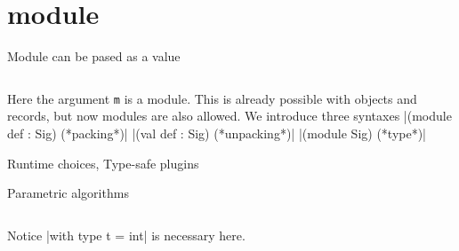 \section{module}

Module can be pased as a value


\inputminted[fontsize=\scriptsize, ]{ocaml}{lang/code/module/intro.ml}

 
Here the argument \verb|m| is a module. This is already possible with
objects and records, but now modules are also allowed.
We introduce three syntaxes 
|(module def : Sig) (*packing*)|
|(val def : Sig) (*unpacking*)|
|(module Sig) (*type*)|




Runtime choices, Type-safe plugins

Parametric algorithms
\inputminted[fontsize=\scriptsize, ]{ocaml}{lang/code/param.ml}

Notice |with type t = int| is necessary here.
\inputminted[fontsize=\scriptsize, ]{ocaml}{lang/code/module/leibniz.ml}


